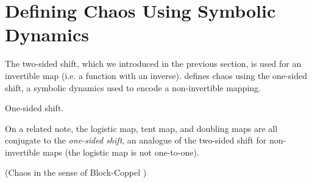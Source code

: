\documentclass[10pt,twoside]{book}
\begin{document}

\section{Defining Chaos Using Symbolic Dynamics}
The two-sided shift, which we introduced in the previous section, is used for an invertible map (i.e. a function with an inverse).
\citet{blockcoppel} defines chaos using the one-sided shift, a symbolic dynamics used to encode a non-invertible mapping.
\begin{definition}
  One-sided shift.
\end{definition}
On a related note, the logistic map, tent map, and doubling maps are all conjugate to the \textit{one-sided shift}, an analogue of the two-sided shift for non-invertible maps (the logistic map is not one-to-one).
\begin{definition}
  (Chaos in the sense of Block-Coppel \citep{blockcoppel})
  \label{defn:blockcoppel}
\end{definition}





\printindex
\end{document}
